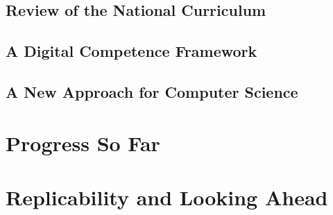 \documentclass[sigconf]{acmart}
\begin{document}
\subsection{Review of the National Curriculum}

\subsection{A Digital Competence Framework}

\subsection{A New Approach for Computer Science}

\section{Progress So Far}

\section{Replicability and Looking Ahead}



 
\end{document}
